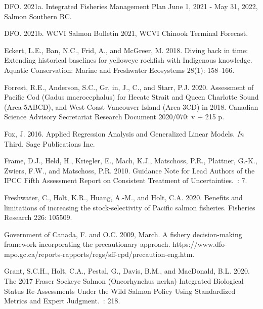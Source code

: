 \documentclass[11pt]{book}
\begin{document}
\begin{CSLReferences}{1}{0}
%
DFO. 2021a. Integrated {Fisheries Management Plan June} 1, 2021 - {May} 31, 2022, {Salmon Southern BC}.

%
DFO. 2021b. {WCVI Salmon Bulletin} 2021, {WCVI Chinook Terminal Forecast}.

%
Eckert, L.E., Ban, N.C., Frid, A., and McGreer, M. 2018. Diving back in time: Extending historical baselines for yelloweye rockfish with {Indigenous} knowledge. Aquatic Conservation: Marine and Freshwater Ecosystems 28(1): 158--166.

%
Forrest, R.E., Anderson, S.C., Gr, in, J., C., and Starr, P.J. 2020. Assessment of {Pacific Cod} ({Gadus} macrocephalus) for {Hecate Strait} and {Queen Charlotte Sound} ({Area 5ABCD}), and {West Coast Vancouver Island} ({Area 3CD}) in 2018. Canadian Science Advisory Secretariat Research Document 2020/070: v + 215 p.

%
Fox, J. 2016. Applied {Regression Analysis} and {Generalized Linear Models}. \emph{In} Third. {Sage Publications Inc.}

%
Frame, D.J., Held, H., Kriegler, E., Mach, K.J., Matschoss, P.R., Plattner, G.-K., Zwiers, F.W., and Matschoss, P.R. 2010. Guidance {Note} for {Lead Authors} of the {IPCC Fifth Assessment Report} on {Consistent Treatment} of {Uncertainties}.~: 7.

%
Freshwater, C., Holt, K.R., Huang, A.-M., and Holt, C.A. 2020. Benefits and limitations of increasing the stock-selectivity of {Pacific} salmon fisheries. Fisheries Research 226: 105509.

%
Government of Canada, F. and O.C. 2009, March. A fishery decision-making framework incorporating the precautionary approach. https://www.dfo-mpo.gc.ca/reports-rapports/regs/sff-cpd/precaution-eng.htm.

%
Grant, S.C.H., Holt, C.A., Pestal, G., Davis, B.M., and MacDonald, B.L. 2020. The 2017 {Fraser Sockeye Salmon} ({Oncorhynchus} nerka) {Integrated Biological Status Re}-{Assessments Under} the {Wild Salmon Policy Using Standardized Metrics} and {Expert Judgment}.~: 218.


\end{CSLReferences}
\end{document}
